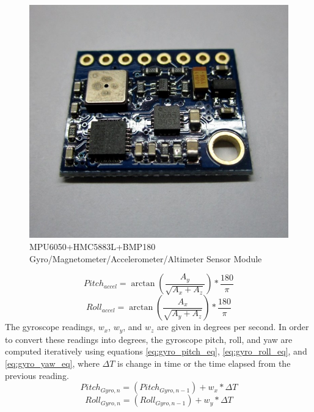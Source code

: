 \documentclass[english]{upeeei}
\begin{document}
\begin{figure}[h]
    \centering
    \includegraphics[scale=0.25]{images/imu_module.jpg}
    \caption{MPU6050+HMC5883L+BMP180 Gyro/Magnetometer/Accelerometer/Altimeter Sensor Module\cite{EDWIMU}}
    \label{fig:imu_module}
\end{figure}
\begin{equation}
    Pitch_{accel} = \arctan(\frac{A_{y}}{\sqrt{A_{x} + A_{z}}}) * \frac{180}{\pi}
    \label{eq:pitch_eq}
\end{equation}
\begin{equation}
    Roll_{accel} = \arctan(\frac{A_{x}}{\sqrt{A_{y} + A_{z}}}) * \frac{180}{\pi}
    \label{eq:roll_eq}
\end{equation}
The gyroscope readings, \(w_{x}\), \(w_{y}\), and \(w_{z}\) are given in degrees per second. In order to convert these readings into
degrees, the gyroscope pitch, roll, and yaw are computed iteratively using equations \ref{eq:gyro_pitch_eq}, \ref{eq:gyro_roll_eq}, and
\ref{eq:gyro_yaw_eq}, where \(\Delta T\) is change in time or the time elapsed from the previous reading.
\begin{equation}
    Pitch_{Gyro, n} = (Pitch_{Gyro, n-1}) + w_{x} * \Delta T
    \label{eq:gyro_pitch_eq}
\end{equation}
\begin{equation}
    Roll_{Gyro, n} = (Roll_{Gyro, n-1}) + w_{y} * \Delta T
    \label{eq:gyro_roll_eq}
\end{equation}
\end{document}
